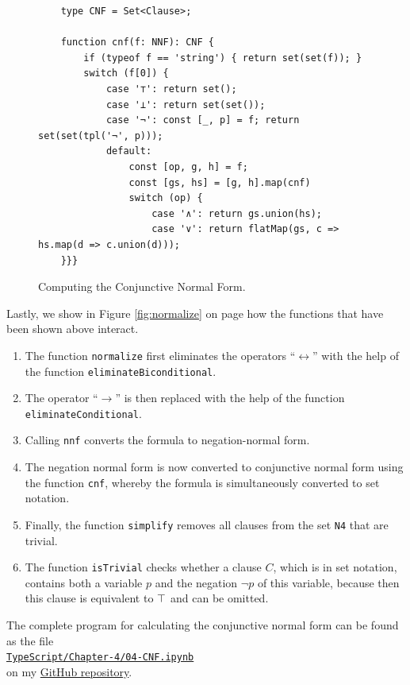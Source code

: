 \begin{figure}[!ht]
  \centering
\begin{verbatim}
    type CNF = Set<Clause>;
                
    function cnf(f: NNF): CNF {
        if (typeof f == 'string') { return set(set(f)); }
        switch (f[0]) {
            case '⊤': return set();     
            case '⊥': return set(set());
            case '¬': const [_, p] = f; return set(set(tpl('¬', p))); 
            default: 
                const [op, g, h] = f;
                const [gs, hs] = [g, h].map(cnf)
                switch (op) { 
                    case '∧': return gs.union(hs);
                    case '∨': return flatMap(gs, c => hs.map(d => c.union(d)));
    }}} 
\end{verbatim}
\vspace*{-0.3cm}
  \caption{Computing the Conjunctive Normal Form. }
  \label{fig:cnf}
\end{figure}
Lastly, we show in Figure \ref{fig:normalize} on page \pageref{fig:normalize}
how the functions that have been shown above interact.
\begin{enumerate}
\item The function \texttt{normalize} first eliminates the operators ``$\leftrightarrow$''
       with the help of the function \linebreak
      \texttt{eliminateBiconditional}.
\item The operator ``$\rightarrow$'' is then replaced with the help of the function
      \texttt{eliminateConditional}.
\item Calling \texttt{nnf} converts the formula to negation-normal form.
\item The negation normal form is now converted to conjunctive normal form using the function \texttt{cnf},
      whereby the formula is simultaneously converted to set notation.  
\item Finally, the function \texttt{simplify} removes all clauses from the set \texttt{N4} that are trivial.
\item The function \texttt{isTrivial} checks whether a clause $C$, which is in set notation,
      contains both a variable $p$ and the negation $\neg p$ of this variable, because then this
      clause is equivalent to $\top$ and can be omitted.
\end{enumerate}
The complete program for calculating the conjunctive normal form can be found as the file
\\[0.2cm]
\hspace*{1.3cm}
\href{https://github.com/karlstroetmann/Logic/blob/master/TypeScript/Chapter-4/04-CNF.ipynb}{\texttt{TypeScript/Chapter-4/04-CNF.ipynb}} 
\\[0.2cm]
on my \href{https://github.com/karlstroetmann/Logic}{GitHub repository}.



